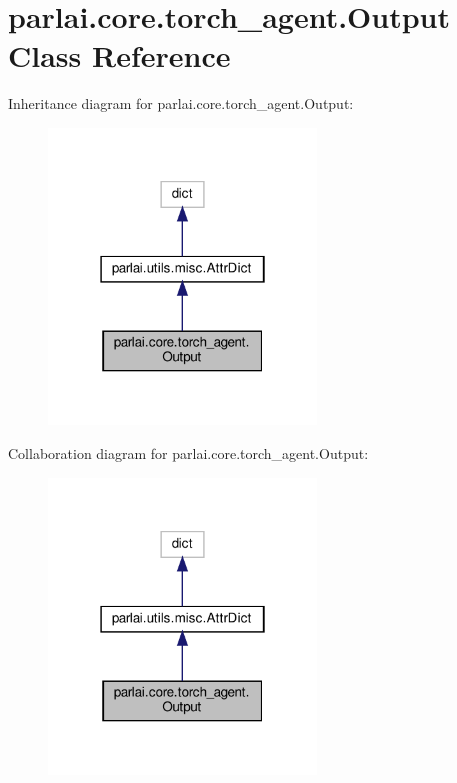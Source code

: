 \hypertarget{classparlai_1_1core_1_1torch__agent_1_1Output}{}\section{parlai.\+core.\+torch\+\_\+agent.\+Output Class Reference}
\label{classparlai_1_1core_1_1torch__agent_1_1Output}


Inheritance diagram for parlai.\+core.\+torch\+\_\+agent.\+Output\+:
\nopagebreak
\begin{figure}[H]
\begin{center}
\leavevmode
\includegraphics[width=202pt]{dc/d0d/classparlai_1_1core_1_1torch__agent_1_1Output__inherit__graph}
\end{center}
\end{figure}


Collaboration diagram for parlai.\+core.\+torch\+\_\+agent.\+Output\+:
\nopagebreak
\begin{figure}[H]
\begin{center}
\leavevmode
\includegraphics[width=202pt]{de/d88/classparlai_1_1core_1_1torch__agent_1_1Output__coll__graph}
\end{center}
\end{figure}
